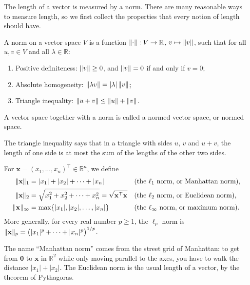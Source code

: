 The length of a vector is measured by a norm. There are many reasonable ways to measure length, so we first collect the properties that every notion of length should have.

\begin{definition}[Norm]\label{L2-def:norm}
    A norm on a vector space $V$ is a function $\lVert \cdot \rVert: V \to \mathbb{R}$, $v \mapsto \lVert v \rVert$, such that for all $u, v \in V$ and all $\lambda \in \mathbb{R}$:
    \begin{enumerate}
        \item Positive definiteness: $\lVert v \rVert \geq 0$, and $\lVert v \rVert = 0$ if and only if $v = 0$;
        \item Absolute homogeneity: $\lVert \lambda v \rVert = |\lambda| \, \lVert v \rVert$;
        \item Triangle inequality: $\lVert u + v \rVert \leq \lVert u \rVert + \lVert v \rVert$.
    \end{enumerate}
    A vector space together with a norm is called a normed vector space, or normed space.
\end{definition}

The triangle inequality says that in a triangle with sides $u$, $v$ and $u + v$, the length of one side is at most the sum of the lengths of the other two sides.

\begin{definition}\label{L2-def:lp}
    For $\mathbf{x} = (x_1, \ldots, x_n)^\top \in \mathbb{R}^n$, we define
    \begin{align*}
        \lVert \mathbf{x} \rVert_1 &= |x_1| + |x_2| + \cdots + |x_n| && \text{(the $\ell_1$ norm, or Manhattan norm)}, \\
        \lVert \mathbf{x} \rVert_2 &= \sqrt{x_1^2 + x_2^2 + \cdots + x_n^2} = \sqrt{\mathbf{x}^\top \mathbf{x}} && \text{(the $\ell_2$ norm, or Euclidean norm)}, \\
        \lVert \mathbf{x} \rVert_\infty &= \max\{|x_1|, |x_2|, \ldots, |x_n|\} && \text{(the $\ell_\infty$ norm, or maximum norm)}.
    \end{align*}
    More generally, for every real number $p \geq 1$, the $\ell_p$ norm is $\lVert \mathbf{x} \rVert_p = \big(|x_1|^p + \cdots + |x_n|^p\big)^{1/p}$.
\end{definition}

The name ``Manhattan norm'' comes from the street grid of Manhattan: to get from $\mathbf{0}$ to $\mathbf{x}$ in $\mathbb{R}^2$ while only moving parallel to the axes, you have to walk the distance $|x_1| + |x_2|$. The Euclidean norm is the usual length of a vector, by the theorem of Pythagoras.

